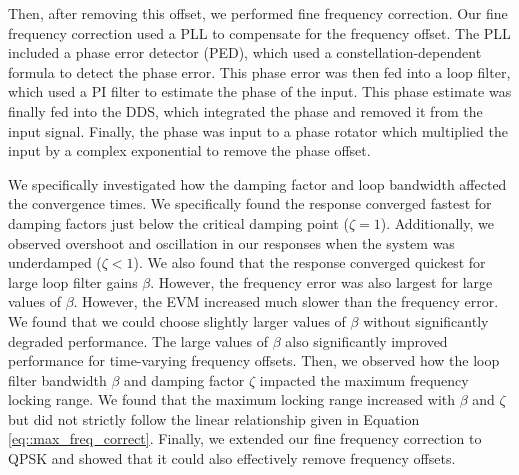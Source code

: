 \documentclass{article}
\begin{document}
Then, after removing this offset, we performed fine frequency correction. Our fine frequency correction used a PLL to compensate for the frequency offset. The PLL included a phase error detector (PED), which used a constellation-dependent formula to detect the phase error. This phase error was then fed into a loop filter, which used a PI filter to estimate the phase of the input. This phase estimate was finally fed into the DDS, which integrated the phase and removed it from the input signal. Finally, the phase was input to a phase rotator which multiplied the input by a complex exponential to remove the phase offset.

We specifically investigated how the damping factor and loop bandwidth affected the convergence times. We specifically found the response converged fastest for damping factors just below the critical damping point ($\zeta = 1$). Additionally, we observed overshoot and oscillation in our responses when the system was underdamped ($\zeta < 1$). We also found that the response converged quickest for large loop filter gains $\beta$. However, the frequency error was also largest for large values of $\beta$. However, the EVM increased much slower than the frequency error. We found that we could choose slightly larger values of $\beta$ without significantly degraded performance. The large values of $\beta$ also significantly improved performance for time-varying frequency offsets. Then, we observed how the loop filter bandwidth $\beta$ and damping factor $\zeta$ impacted the maximum frequency locking range. We found that the maximum locking range increased with $\beta$ and $\zeta$ but did not strictly follow the linear relationship given in Equation \ref{eq::max_freq_correct}. Finally, we extended our fine frequency correction to QPSK and showed that it could also effectively remove frequency offsets.
\end{document}
